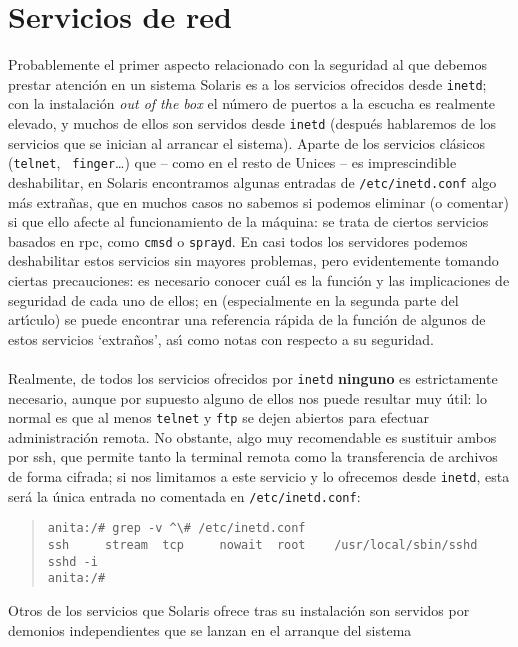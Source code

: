 \section{Servicios de red}
Probablemente el primer aspecto relacionado con la seguridad al que debemos
prestar atenci\'on en un sistema Solaris es a los servicios ofrecidos
desde {\tt inetd}; con la instalaci\'on {\it out of the box} el n\'umero de
puertos a la escucha es realmente elevado, y muchos de ellos son servidos
desde {\tt inetd} (despu\'es hablaremos de los servicios que se inician al
arrancar el sistema). Aparte de los servicios cl\'asicos ({\tt telnet}, {\tt
finger}\ldots) que -- como en el resto de Unices -- es imprescindible 
deshabilitar, en Solaris encontramos algunas entradas de {\tt /etc/inetd.conf}
algo m\'as extra\~nas, que en muchos casos no sabemos si podemos eliminar (o
comentar) si que ello afecte al funcionamiento de la m\'aquina: se trata de
ciertos servicios basados en {\sc rpc}, como {\tt cmsd} o {\tt sprayd}. En
casi todos los servidores podemos deshabilitar estos servicios sin mayores
problemas, pero evidentemente tomando ciertas precauciones: es necesario conocer
cu\'al es la funci\'on y las implicaciones de seguridad de cada uno de ellos;
en \cite{kn:fly00b} (especialmente en la segunda parte del art\'{\i}culo) se 
puede encontrar una referencia r\'apida de la funci\'on de algunos de estos 
servicios `extra\~nos', as\'{\i} como notas con respecto a su seguridad.\\
\\Realmente, de todos
los servicios ofrecidos por {\tt inetd} {\bf ninguno} es estrictamente 
necesario, aunque por supuesto alguno de ellos nos puede resultar muy \'util:
lo normal es que al menos {\tt telnet} y {\tt ftp} se dejen abiertos para 
efectuar administraci\'on remota. No obstante, algo muy recomendable es 
sustituir ambos por {\sc ssh}, que permite tanto la terminal remota como la 
transferencia de archivos de forma cifrada; si nos limitamos a este servicio y
lo ofrecemos desde {\tt inetd}, esta ser\'a la \'unica entrada no comentada
en {\tt /etc/inetd.conf}:
\begin{quote}
\begin{verbatim}
anita:/# grep -v ^\# /etc/inetd.conf
ssh     stream  tcp     nowait  root    /usr/local/sbin/sshd    sshd -i
anita:/# 
\end{verbatim}
\end{quote}
Otros de los servicios que Solaris ofrece tras su instalaci\'on son servidos
por demonios in\-de\-pen\-dien\-tes que se lanzan en el arranque del sistema 
